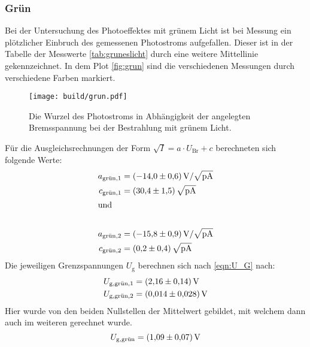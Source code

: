 \subsubsection{Grün}
Bei der Untersuchung des Photoeffektes mit grünem Licht ist bei Messung ein plötzlicher Einbruch des gemessenen Photostroms aufgefallen.
Dieser ist in der Tabelle der Messwerte \autoref{tab:gruneslicht} durch eine weitere Mittellinie gekennzeichnet.
In dem Plot \autoref{fig:grun} sind die verschiedenen Messungen durch verschiedene Farben markiert.
\begin{figure}[H]
  \centering
  \texttt{[image: build/grun.pdf]}
  \caption{Die Wurzel des Photostroms in Abhängigkeit der angelegten Bremsspannung bei der Bestrahlung mit grünem Licht.}
  \label{fig:grun}
\end{figure}
\noindent
Für die Ausgleichsrechnungen der Form $\sqrt{I} = a \cdot U_{\text{Br}} + c $ berechneten sich folgende Werte:
\begin{align*}
  a_{\text{grün},1} &= \SI{-14.0 \pm 0.6}{\volt\per\sqrt{\pico\ampere}}\\
  c_{\text{grün},1} &= \SI{30.4 \pm 1.5}{\sqrt{\pico\ampere}}\\
  \intertext{und}\\
  a_{\text{grün},2} &= \SI{-15.8 \pm 0.9}{\volt\per\sqrt{\pico\ampere}}\\
  c_{\text{grün},2} &= \SI{0.2 \pm 0.4}{\sqrt{\pico\ampere}}
\end{align*}
Die jeweiligen Grenzspannungen $U_{\text{g}}$ berechnen sich nach \eqref{eqn:U_G} nach:
\begin{align*}
  U_{\text{g},\text{grün},1} &= \SI{2.16 \pm 0.14}{\volt}\\
  U_{\text{g},\text{grün},2} &= \SI{0.014 \pm 0.028}{\volt}\\
\end{align*}
Hier wurde von den beiden Nullstellen der Mittelwert gebildet, mit welchem dann auch im weiteren gerechnet wurde.
\begin{equation*}
  U_{\text{g},\text{grün}} = \SI{1.09 \pm 0.07}{\volt}
\end{equation*}

